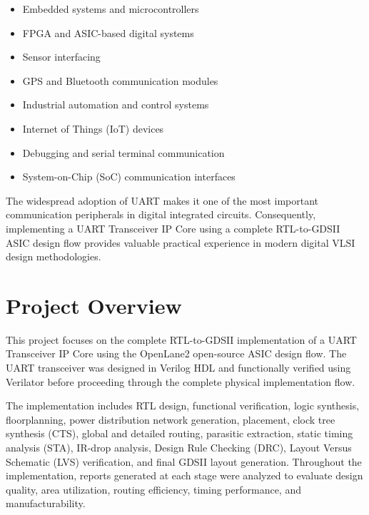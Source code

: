 \begin{itemize}

\item Embedded systems and microcontrollers

\item FPGA and ASIC-based digital systems

\item Sensor interfacing

\item GPS and Bluetooth communication modules

\item Industrial automation and control systems

\item Internet of Things (IoT) devices

\item Debugging and serial terminal communication

\item System-on-Chip (SoC) communication interfaces

\end{itemize}

The widespread adoption of UART makes it one of the most important communication peripherals in digital integrated circuits. Consequently, implementing a UART Transceiver IP Core using a complete RTL-to-GDSII ASIC design flow provides valuable practical experience in modern digital VLSI design methodologies.

\clearpage


\section{Project Overview}

This project focuses on the complete RTL-to-GDSII implementation of 
a UART Transceiver IP Core using the OpenLane2 open-source ASIC design flow. The UART transceiver was designed in Verilog HDL and functionally verified using Verilator before proceeding through the complete physical implementation flow.

The implementation includes RTL design, functional verification, logic synthesis, floorplanning, power distribution network generation, placement, clock tree synthesis (CTS), global and detailed routing, parasitic extraction, static timing analysis (STA), IR-drop analysis, Design Rule Checking (DRC), Layout Versus Schematic (LVS) verification, and final GDSII layout generation. Throughout the implementation, reports generated at each stage were analyzed to evaluate design quality, area utilization, routing efficiency, timing performance, and manufacturability.

